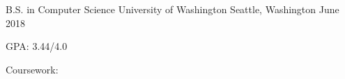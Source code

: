 \begin{cventries}
    \cventry
        {B.S. in Computer Science} %
        {University of Washington} %
        {Seattle, Washington} %
        {June 2018} %
        {\begin{cvitems} %
                \item
                    {GPA: 3.44/4.0}
                \item 
                    {Coursework:
                        \footnotesize{
                            \newline
                        }
                    }
            \end{cvitems}
        }
\end{cventries}
